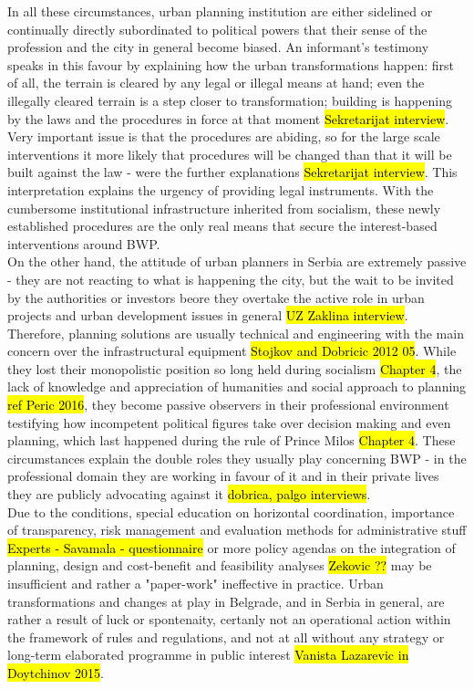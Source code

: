 \documentclass[11pt]{report}
\begin{document}
In all these circumstances, urban planning institution are either sidelined or continually directly subordinated to political powers that their sense of the profession and the city in general become biased.
An informant's testimony speaks in this favour by explaining how the urban transformations happen: first of all, the terrain is cleared by any legal or illegal means at hand; even the illegally cleared terrain is a step closer to transformation; building is happening by the laws and the procedures in force at that moment \hl{Sekretarijat interview}.
Very important issue is that the procedures are abiding, so for the large scale interventions it more likely that procedures will be changed than that it will be built against the law - were the further explanations \hl{Sekretarijat interview}.
This interpretation explains the urgency of providing legal instruments. With the cumbersome institutional infrastructure inherited from socialism, these newly established procedures are the only real means that secure the interest-based interventions around BWP.
\\
On the other hand, the attitude of urban planners in Serbia are extremely passive - they are not reacting to what is happening the city, but the wait to be invited by the authorities or investors beore they overtake the active role in urban projects and urban development issues in general \hl{UZ Zaklina interview}.
Therefore, planning solutions are usually technical and engineering with the main concern over the infrastructural equipment \hl{Stojkov and Dobricic 2012 05}.
While they lost their monopolistic position so long held during socialism \hl{Chapter 4}, the lack of knowledge and appreciation of humanities and social approach to planning \hl{ref Peric 2016}, they become passive observers in their professional environment testifying how incompetent political figures take over decision making and even planning, which last happened during the rule of Prince Milos \hl{Chapter 4}.
These circumstances explain the double roles they usually play concerning BWP - in the professional domain they are working in favour of it and in their private lives they are publicly advocating against it \hl{dobrica, palgo interviews}.
\\
Due to the conditions, special education on horizontal coordination, importance of transparency, risk management and evaluation methods for administrative stuff \hl{Experts - Savamala - questionnaire} or more policy agendas on the integration of planning, design and cost-benefit and feasibility analyses \hl{Zekovic ??} may be insufficient and rather a "paper-work" ineffective in practice. 
Urban transformations and changes at play in Belgrade, and in Serbia in general, are rather a result of luck or spontenaity, certanly not an operational action within the framework of rules and regulations, and not at all without any strategy or long-term elaborated programme in public interest \hl{Vanista Lazarevic in Doytchinov 2015}.
\end{document}
